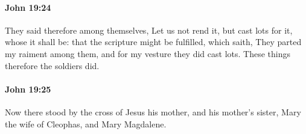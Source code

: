 		\paragraph{John 19:24} %
			\label{JOHN-19-24}

			They said therefore among themselves, Let us not rend it, but cast lots for it, whose it shall be: that the scripture might be fulfilled, which saith, They parted my raiment among them, and for my vesture they did cast lots. These things therefore the soldiers did.

			\begin{framed}
				\scriptsize
				\begin{compactdesc}
					\item[SBLG] 
				\end{compactdesc}
			\end{framed}

		\paragraph{John 19:25} %
			\label{JOHN-19-25}

			Now there stood by the cross of Jesus his mother, and his mother's sister, Mary the wife of Cleophas, and Mary Magdalene.

